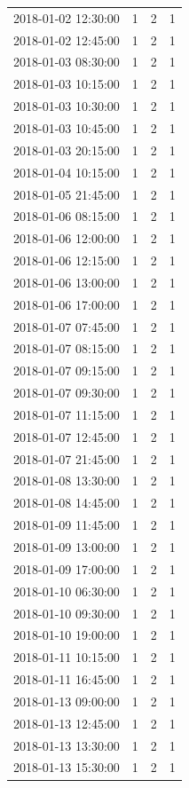 \begin{tabular}{lrrr}
2018-01-02 12:30:00 & 1 & 2 & 1 \\
2018-01-02 12:45:00 & 1 & 2 & 1 \\
2018-01-03 08:30:00 & 1 & 2 & 1 \\
2018-01-03 10:15:00 & 1 & 2 & 1 \\
2018-01-03 10:30:00 & 1 & 2 & 1 \\
2018-01-03 10:45:00 & 1 & 2 & 1 \\
2018-01-03 20:15:00 & 1 & 2 & 1 \\
2018-01-04 10:15:00 & 1 & 2 & 1 \\
2018-01-05 21:45:00 & 1 & 2 & 1 \\
2018-01-06 08:15:00 & 1 & 2 & 1 \\
2018-01-06 12:00:00 & 1 & 2 & 1 \\
2018-01-06 12:15:00 & 1 & 2 & 1 \\
2018-01-06 13:00:00 & 1 & 2 & 1 \\
2018-01-06 17:00:00 & 1 & 2 & 1 \\
2018-01-07 07:45:00 & 1 & 2 & 1 \\
2018-01-07 08:15:00 & 1 & 2 & 1 \\
2018-01-07 09:15:00 & 1 & 2 & 1 \\
2018-01-07 09:30:00 & 1 & 2 & 1 \\
2018-01-07 11:15:00 & 1 & 2 & 1 \\
2018-01-07 12:45:00 & 1 & 2 & 1 \\
2018-01-07 21:45:00 & 1 & 2 & 1 \\
2018-01-08 13:30:00 & 1 & 2 & 1 \\
2018-01-08 14:45:00 & 1 & 2 & 1 \\
2018-01-09 11:45:00 & 1 & 2 & 1 \\
2018-01-09 13:00:00 & 1 & 2 & 1 \\
2018-01-09 17:00:00 & 1 & 2 & 1 \\
2018-01-10 06:30:00 & 1 & 2 & 1 \\
2018-01-10 09:30:00 & 1 & 2 & 1 \\
2018-01-10 19:00:00 & 1 & 2 & 1 \\
2018-01-11 10:15:00 & 1 & 2 & 1 \\
2018-01-11 16:45:00 & 1 & 2 & 1 \\
2018-01-13 09:00:00 & 1 & 2 & 1 \\
2018-01-13 12:45:00 & 1 & 2 & 1 \\
2018-01-13 13:30:00 & 1 & 2 & 1 \\
2018-01-13 15:30:00 & 1 & 2 & 1 \\

\end{tabular}
